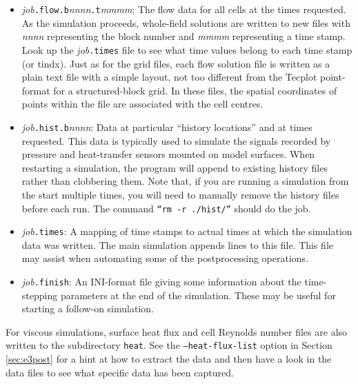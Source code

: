 \documentclass[12pt,a4paper,twoside]{article}
\begin{document}
         \begin{itemize}
           \item \textit{job}\texttt{.flow.b}\textit{nnnn}\texttt{.t}\textit{mmmm}:
             The flow data for all cells at the times requested.
             As the simulation proceeds, whole-field solutions are written
             to new files with \textit{nnnn} representing the block number and
             \textit{mmmm} representing a time stamp.
             Look up the \textit{job}\texttt{.times} file to see what time values
             belong to each time stamp (or tindx).
             Just as for the grid files, each flow solution file is written 
             as a plain text file with a simple layout, not too different from 
             the Tecplot point-format for a structured-block grid.
             In these files, the spatial coordinates of points within the file are
             associated with the cell centres.
           \item  \textit{job}\texttt{.hist.b}\textit{nnnn}: 
             Data at particular ``history locations'' and at times requested.
             This data is typically used to simulate the signals recorded by pressure 
             and heat-transfer sensors mounted on model surfaces.
             When restarting a simulation, the program will append to existing history files 
             rather than clobbering them.
             Note that, if you are running a simulation from the start multiple times, 
             you will need to manually remove the history files before each run.  
             The command \texttt{``rm -r ./hist/''} should do the job.
           \item  \textit{job}\texttt{.times}: 
             A mapping of time stamps to actual times at which the simulation
             data was written.
             The main simulation appends lines to this file.
             This file may assist when automating some of the postprocessing operations.
           \item  \textit{job}\texttt{.finish}: 
             An INI-format file giving some information about the time-stepping parameters
             at the end of the simulation.
             These may be useful for starting a follow-on simulation.
         \end{itemize}

\medskip
For viscous simulations, surface heat flux and cell Reynolds number files are also written to the subdirectory \texttt{heat}.
See the \texttt{--heat-flux-list} option in Section\,\ref{sec:e3post} for a hint at how to extract the data and then
have a look in the data files to see what specific data has been captured. 
\end{document}
